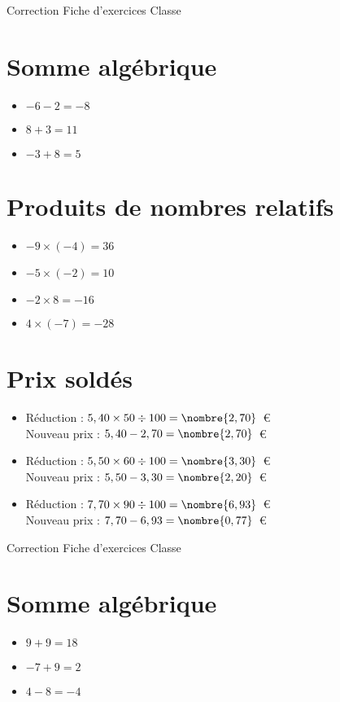 \documentclass[a4paper,11pt,fleqn]{article}
\begin{document}
\pagestyle{empty}


{Correction} \hfill {\huge Fiche d'exercices } \hfill {Classe}

\section{Somme algébrique}
\begin{itemize}

  \item $-6 -2=-8$
  \item $8 +3=11$
  \item $-3 +8=5$
\end{itemize}

\section{Produits de nombres relatifs}
\begin{itemize}

  \item $-9\times(-4)=36$
  \item $-5\times(-2)=10$
  \item $-2\times8=-16$
  \item $4\times(-7)=-28$
\end{itemize}

\section{Prix soldés}
\begin{itemize}

  \item Réduction : $5,40\times50\div100=\nombre{2,70}$~€\\
  Nouveau prix : $5,40-2,70=\nombre{2,70}$~€
  \item Réduction : $5,50\times60\div100=\nombre{3,30}$~€\\
  Nouveau prix : $5,50-3,30=\nombre{2,20}$~€
  \item Réduction : $7,70\times90\div100=\nombre{6,93}$~€\\
  Nouveau prix : $7,70-6,93=\nombre{0,77}$~€
\end{itemize}
\newpage
\setcounter{exo}{0}
\setcounter{section}{0}
{Correction} \hfill {\huge Fiche d'exercices } \hfill {Classe}

\section{Somme algébrique}
\begin{itemize}

  \item $9 +9=18$
  \item $-7 +9=2$
  \item $4 -8=-4$
\end{itemize}
\end{document}
